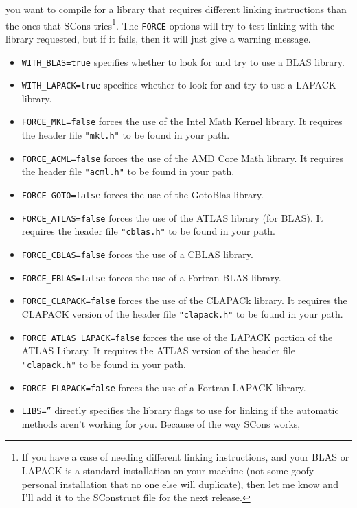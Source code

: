 \documentclass[twoside,letterpaper,11pt]{article}
\begin{document}
\begin{enumerate}
you want to compile for a library that requires different linking instructions than the 
ones that SCons tries\footnote{
If you have a case of needing different linking instructions, and your BLAS or LAPACK is a standard
installation on your machine (not some goofy personal installation that no one else will duplicate),
then let me know and I'll add it to the SConstruct file for the next release.}.
The \texttt{FORCE} options will try to test linking with the library requested,
but if it fails, then it will just give a warning message.
\begin{itemize}
\item \texttt{WITH\_BLAS=true} specifies whether to look for and try to use a BLAS library.
\item \texttt{WITH\_LAPACK=true} specifies whether to look for and try to use a LAPACK library.
\item \texttt{FORCE\_MKL=false} forces the use of the Intel Math Kernel library. 
It requires the header file \texttt{"mkl.h"} to be found in your path. 
\item \texttt{FORCE\_ACML=false} forces the use of the AMD Core Math library.  
It requires the header file \texttt{"acml.h"} to be found in your path.
\item \texttt{FORCE\_GOTO=false} forces the use of the GotoBlas library.  
\item \texttt{FORCE\_ATLAS=false} forces the use of the ATLAS library (for BLAS).  
It requires the header file \texttt{"cblas.h"} to be found in your path.
\item \texttt{FORCE\_CBLAS=false} forces the use of a CBLAS library.
\item \texttt{FORCE\_FBLAS=false} forces the use of a Fortran BLAS library.
\item \texttt{FORCE\_CLAPACK=false} forces the use of the CLAPACk library. 
It requires the CLAPACK version of the header file \texttt{"clapack.h"} to be found in your path.
\item \texttt{FORCE\_ATLAS\_LAPACK=false} forces the use of the LAPACK portion
of the ATLAS Library.  
It requires the ATLAS version of the header file \texttt{"clapack.h"} to be found in your path.
\item \texttt{FORCE\_FLAPACK=false} forces the use of a Fortran LAPACK library.
\item \texttt{LIBS=''} directly specifies the library flags to use for linking if the automatic methods aren't working for you.  Because of the way SCons works,

\end{itemize}
\end{enumerate}
\end{document}
